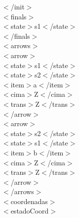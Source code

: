 \documentclass[12pt,a4paper,spanish]{book}
\begin{document}
{\indent $<$/init$>$\\

\indent $<$finals$>$\\

\indent \indent $<$state$>$s1$<$/state$>$\\

\indent $<$/finals$>$\\

\indent $<$arrows$>$\\

\indent \indent $<$arrow$>$\\

\indent \indent \indent $<$state$>$s1$<$/state$>$\\

\indent \indent \indent $<$state$>$s2$<$/state$>$\\

\indent \indent \indent $<$item$>$a$<$/item$>$\\

\indent \indent \indent $<$cima$>$Z$<$/cima$>$\\

\indent \indent \indent $<$trans$>$Z$<$/trans$>$\\

\indent \indent $<$/arrow$>$\\

\indent \indent $<$arrow$>$\\

\indent \indent \indent $<$state$>$s2$<$/state$>$\\

\indent \indent \indent $<$state$>$s1$<$/state$>$\\

\indent \indent \indent $<$item$>$b$<$/item$>$\\

\indent \indent \indent $<$cima$>$Z$<$/cima$>$\\

\indent \indent \indent $<$trans$>$Z$<$/trans$>$\\

\indent \indent $<$/arrow$>$\\

\indent $<$/arrows$>$\\

$<$coordenadas$>$\\

$<$estadoCoord$>$\\

}
\end{document}
